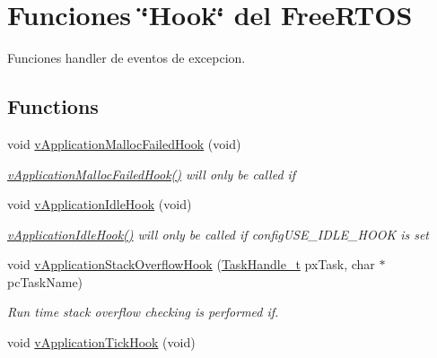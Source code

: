 \hypertarget{group___h_o_o_k_f_u_n_c_t_i_o_n_s}{}\section{Funciones \char`\"{}\+Hook\char`\"{} del Free\+R\+T\+OS}
\label{group___h_o_o_k_f_u_n_c_t_i_o_n_s}


Funciones handler de eventos de excepcion.  


\subsection*{Functions}
\begin{DoxyCompactItemize}
\item 
void \hyperlink{group___h_o_o_k_f_u_n_c_t_i_o_n_s_gab7e5c95cf72a3f819bc4462a7fb62ca3}{v\+Application\+Malloc\+Failed\+Hook} (void)
\begin{DoxyCompactList}\small\item\em \hyperlink{group___h_o_o_k_f_u_n_c_t_i_o_n_s_gab7e5c95cf72a3f819bc4462a7fb62ca3}{v\+Application\+Malloc\+Failed\+Hook()} will only be called if \end{DoxyCompactList}\item 
void \hyperlink{group___h_o_o_k_f_u_n_c_t_i_o_n_s_ga97fd430f36f8b065226e2bff9bad1de5}{v\+Application\+Idle\+Hook} (void)
\begin{DoxyCompactList}\small\item\em \hyperlink{group___h_o_o_k_f_u_n_c_t_i_o_n_s_ga97fd430f36f8b065226e2bff9bad1de5}{v\+Application\+Idle\+Hook()} will only be called if config\+U\+S\+E\+\_\+\+I\+D\+L\+E\+\_\+\+H\+O\+OK is set \end{DoxyCompactList}\item 
void \hyperlink{group___h_o_o_k_f_u_n_c_t_i_o_n_s_ga306672a74bdd13ce210c05fca3385c59}{v\+Application\+Stack\+Overflow\+Hook} (\hyperlink{task_8h_ae95f44d4cfeb4a599c6cc258d241cb6b}{Task\+Handle\+\_\+t} px\+Task, char $\ast$pc\+Task\+Name)
\begin{DoxyCompactList}\small\item\em Run time stack overflow checking is performed if. \end{DoxyCompactList}\item 
void \hyperlink{group___h_o_o_k_f_u_n_c_t_i_o_n_s_ga9ca051aa77e17583aa5a85d5de5c199a}{v\+Application\+Tick\+Hook} (void)

\end{DoxyCompactItemize}
